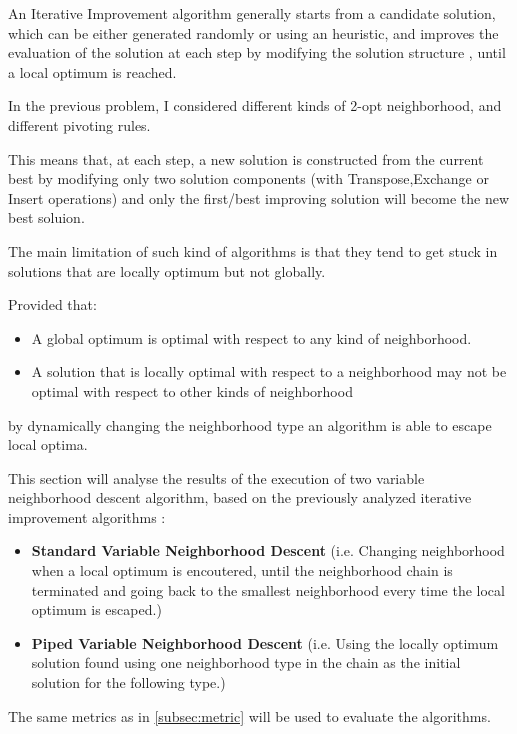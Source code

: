 \begin{homeworkProblem}
 
An Iterative Improvement algorithm generally starts from a candidate solution, which can be either generated randomly or using an heuristic, and improves the evaluation of the solution at each step by modifying the solution structure , until a local optimum is reached.

In the previous problem, I considered different kinds of 2-opt neighborhood, and different pivoting rules.

This means that, at each step, a new solution is constructed from the current best by modifying only two solution components (with Transpose,Exchange or Insert operations) and only the first/best improving solution will become the new best soluion.

The main limitation of such kind of algorithms is that they tend to get stuck in solutions that are locally optimum but not globally.

Provided that:
\begin{itemize}
\item A global optimum is optimal with respect to any kind of neighborhood. 
\item A solution that is locally optimal with respect to a neighborhood may not be optimal with respect to other kinds of neighborhood
\end{itemize}
by dynamically changing the neighborhood type an algorithm is able to escape local optima.

This section will analyse the results of the execution of two variable neighborhood descent algorithm, based on the previously analyzed iterative improvement algorithms :
\begin{itemize}
\item \textbf{Standard Variable Neighborhood Descent} (i.e. Changing neighborhood when a local optimum is encoutered, until the neighborhood chain is terminated and going back to the smallest neighborhood every time the local optimum is escaped.)
\item \textbf{Piped Variable Neighborhood Descent} (i.e. Using the locally optimum solution found using one neighborhood type in the chain as the initial solution for the following type.)
\end{itemize}
The same metrics as in \ref{subsec:metric} will be used to evaluate the algorithms.



\end{homeworkProblem}
